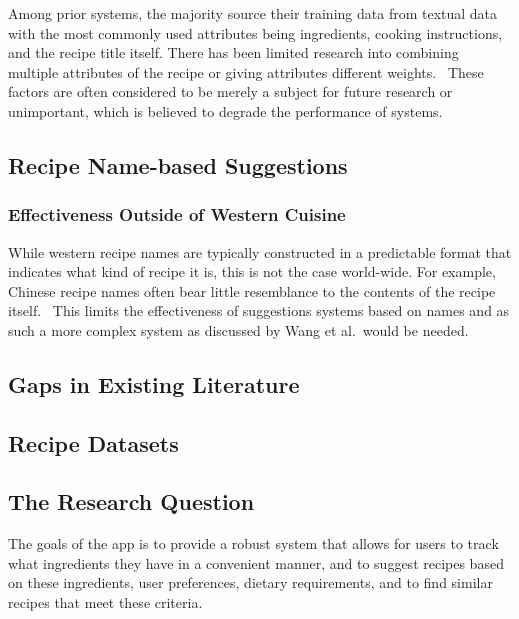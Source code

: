 Among prior systems, the majority source their training data from textual data with the most commonly used
attributes being ingredients, cooking instructions, and the recipe title itself. There has been limited research
into combining multiple attributes of the recipe or giving attributes different weights.~\cite{chen_cross-modal_2017} These factors are often
considered to be merely a subject for future research or unimportant, which is believed to degrade the performance
of systems.~\cite{bondevik_systematic_2024}

\subsection{Recipe Name-based Suggestions}

\subsubsection{Effectiveness Outside of Western Cuisine}
While western recipe names are typically constructed in a predictable format
that indicates what kind of recipe it is, this is not the case world-wide.
For example, Chinese recipe names often bear little resemblance to the contents
of the recipe itself.~\cite{wang_substructure_2008} This limits the effectiveness
of suggestions systems based on names and as such a more complex system as discussed
by Wang et al.\ would be needed.

\subsection{Gaps in Existing Literature}

\subsection{Recipe Datasets}

\subsection{The Research Question}

The goals of the \chef{} app is to provide a robust system that allows for users to track what ingredients they have in a
convenient manner, and to suggest recipes based on these ingredients, user preferences, dietary requirements, and to find
similar recipes that meet these criteria.

